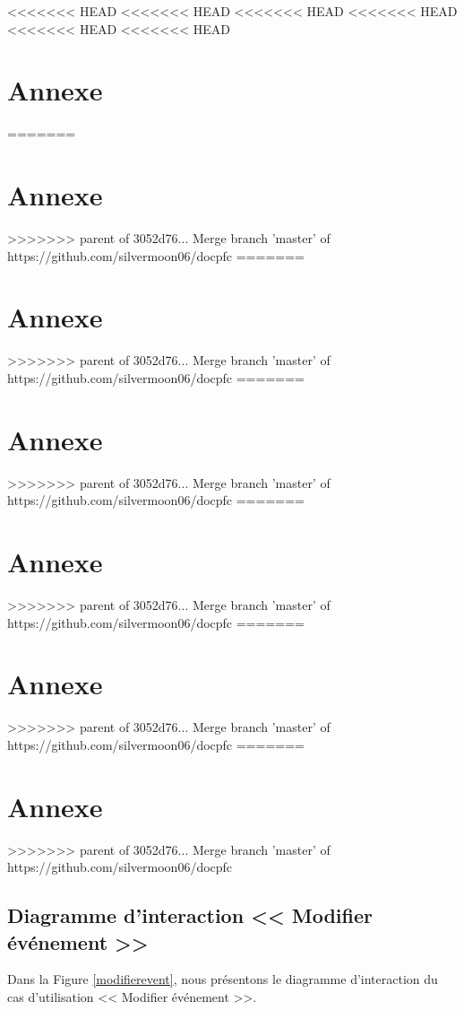 
\appendix
<<<<<<< HEAD
<<<<<<< HEAD
<<<<<<< HEAD
<<<<<<< HEAD
<<<<<<< HEAD
<<<<<<< HEAD
\chapter{Annexe}
=======
\chapter*{Annexe}
>>>>>>> parent of 3052d76... Merge branch 'master' of https://github.com/silvermoon06/docpfc
=======
\chapter*{Annexe}
>>>>>>> parent of 3052d76... Merge branch 'master' of https://github.com/silvermoon06/docpfc
=======
\chapter*{Annexe}
>>>>>>> parent of 3052d76... Merge branch 'master' of https://github.com/silvermoon06/docpfc
=======
\chapter*{Annexe}
>>>>>>> parent of 3052d76... Merge branch 'master' of https://github.com/silvermoon06/docpfc
=======
\chapter*{Annexe}
>>>>>>> parent of 3052d76... Merge branch 'master' of https://github.com/silvermoon06/docpfc
=======
\chapter*{Annexe}
>>>>>>> parent of 3052d76... Merge branch 'master' of https://github.com/silvermoon06/docpfc
\renewcommand{\headrulewidth}{1pt}




\section{Diagramme d'interaction << Modifier \'ev\'enement >>}

Dans la Figure \ref{modifierevent}, nous pr\'esentons le diagramme d'interaction du cas d'utilisation << Modifier \'ev\'enement >>. 

